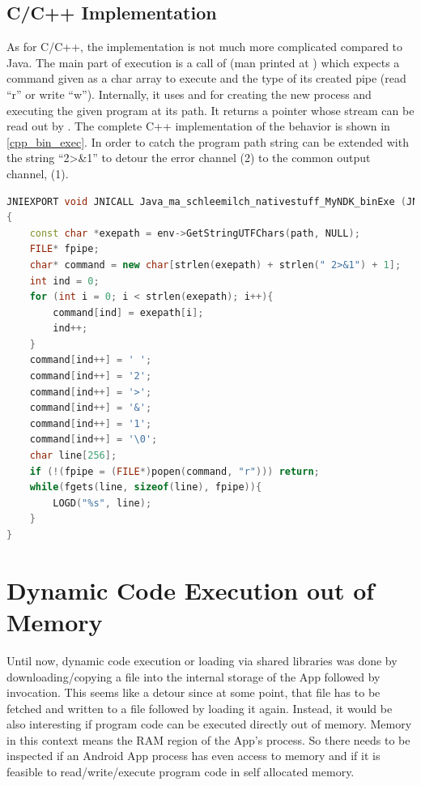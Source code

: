 \subsection{C/C++ Implementation}\label{dyn_bin_c}
As for C/C++, the implementation is not much more complicated compared to Java.
The main part of execution is a call of 
(man printed at \parencite{popen}) which expects a command
given as a char array to execute and the type of its created pipe (read ``r'' or write ``w''). Internally, it uses  and  for creating the new
process and executing the given program at its path. It returns a  pointer
whose stream can be read out by . The complete C++ implementation
of the behavior is shown in \autoref{cpp_bin_exec}. In order to catch 
the program path string can be extended with the string ``2>\&1'' to detour the error
channel (2) to the common output channel,  (1).
\begin{lstlisting}[language=C++, caption=C++ Native Exec(), label=cpp_bin_exec]
JNIEXPORT void JNICALL Java_ma_schleemilch_nativestuff_MyNDK_binExe (JNIEnv *env, object obj, jstring path)
{
	const char *exepath = env->GetStringUTFChars(path, NULL);
	FILE* fpipe;
	char* command = new char[strlen(exepath) + strlen(" 2>&1") + 1];
	int ind = 0;
	for (int i = 0; i < strlen(exepath); i++){
		command[ind] = exepath[i];
		ind++;
	}
	command[ind++] = ' ';
	command[ind++] = '2';
	command[ind++] = '>';
	command[ind++] = '&';
	command[ind++] = '1';
	command[ind++] = '\0';
	char line[256];
	if (!(fpipe = (FILE*)popen(command, "r"))) return;
	while(fgets(line, sizeof(line), fpipe)){
		LOGD("%s", line);
	}
}
\end{lstlisting}

\section{Dynamic Code Execution out of Memory}\label{section:dyn_code_memory}

Until now, dynamic code execution or loading via shared libraries was done
by downloading/copying a file into the internal storage of the App followed
by invocation. This seems like a detour since at some point, that file has to be fetched and written to a file followed by loading it again.
Instead, it would be also interesting if program code can be executed directly
out of memory. Memory in this context means the RAM region of the App's process.
So there needs to be inspected if an Android App process has even access
to memory and if it is feasible to read/write/execute program code in self
allocated memory.

